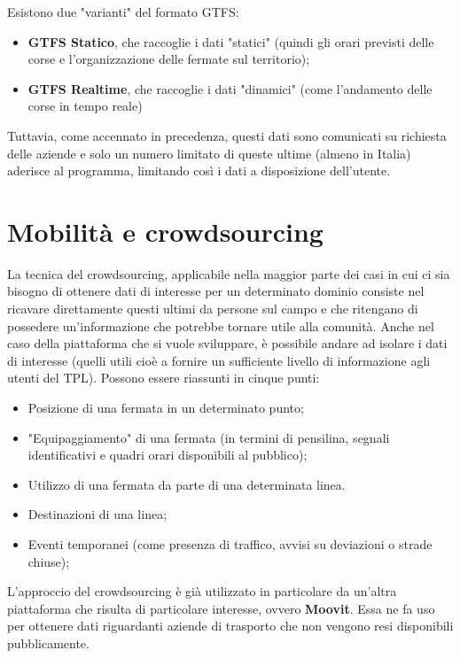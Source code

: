     Esistono due "varianti" del formato GTFS:
    \begin{itemize}
        \item \textbf{GTFS Statico}, che raccoglie i dati "statici" (quindi gli orari previsti delle corse e l'organizzazione delle fermate sul territorio);
        \item \textbf{GTFS Realtime}, che raccoglie i dati "dinamici" (come l'andamento delle corse in tempo reale)
    \end{itemize}

    Tuttavia, come accennato in precedenza, questi dati sono comunicati su richiesta delle aziende e solo un numero limitato di queste ultime (almeno in Italia) aderisce al programma, limitando così i dati a disposizione dell'utente.

\section{Mobilità e crowdsourcing}
    La tecnica del crowdsourcing, applicabile nella maggior parte dei casi in cui ci sia bisogno di ottenere dati di interesse per un determinato dominio consiste nel ricavare direttamente questi ultimi da persone sul campo e che ritengano di possedere un'informazione che potrebbe tornare utile alla comunità.
    Anche nel caso della piattaforma che si vuole sviluppare, è possibile andare ad isolare i dati di interesse (quelli utili cioè a fornire un sufficiente livello di informazione agli utenti del TPL). Possono essere riassunti in cinque punti:
            \begin{itemize}
                \item Posizione di una fermata in un determinato punto;
                \item "Equipaggiamento" di una fermata (in termini di pensilina, segnali identificativi e quadri orari disponibili al pubblico);
                \item Utilizzo di una fermata da parte di una determinata linea.
                \item Destinazioni di una linea;
                \item Eventi temporanei (come presenza di traffico, avvisi su deviazioni o strade chiuse);
            \end{itemize}

        L'approccio del crowdsourcing è già utilizzato in particolare da un'altra piattaforma che risulta di particolare interesse, ovvero \textbf{Moovit}. Essa ne fa uso per ottenere dati riguardanti aziende di trasporto che non vengono resi disponibili pubblicamente.

